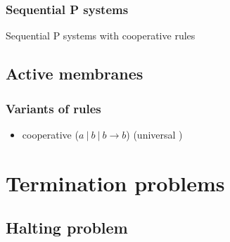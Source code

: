     \begin{frame}[t]\frametitle{Sequential P systems}
      Sequential P systems with cooperative rules
    \end{frame}
    \note{}


  \subsection{Active membranes} %
  \label{sub:active_membranes}

    \begin{frame}[t]\frametitle{Variants of rules}
      \begin{itemize}
        \item cooperative ($a\ |\ b\ |\ b \rightarrow b$) (universal \cite{Paun98})
      \end{itemize}
    \end{frame}
    \note{}



\section{Termination problems} %
\label{sec:termination_problems}

  \subsection{Halting problem} %
  \label{sub:halting_problem}
  
